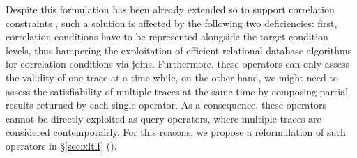 Despite this formulation has been already extended so to support correlation constraints \cite{BurattinMS16}, such a solution is affected by the following two deficiencies: first, correlation-conditions have to be represented alongside the target condition levels, thus hampering the exploitation of efficient relational database algorithms for correlation conditions via joins. Furthermore, these operators can only assess the validity of one trace at a time while, on the other hand, we might need to assess the satisfiability of multiple traces at the same time by composing partial results returned by each single operator. As a consequence, these operators cannot be directly exploited as query operators, where multiple traces are considered contemporairly. %
For this reasons, we propose a reformulation of such operators in \S\ref{sec:xltlf} (\xLTLf). 
